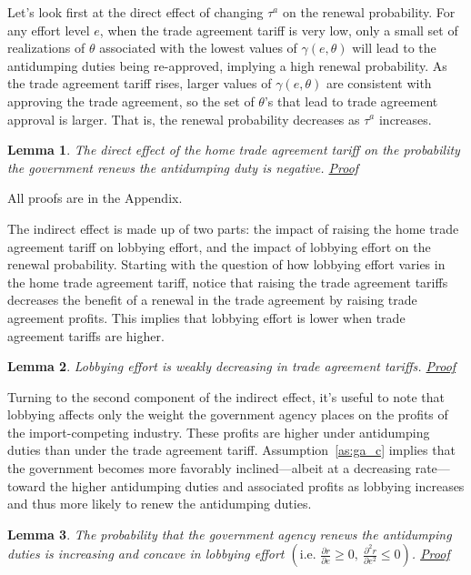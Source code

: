 \documentclass[10pt]{article}
\newtheorem{lemma}{Lemma}
\newcommand{\ta}{\theta}
\newcommand{\ga}{\gamma}
\begin{document}
Let's look first at the direct effect of changing $\tau^a$ on the renewal probability. For any effort level $e$, when the trade agreement tariff is very low, only a small set of realizations of $\ta$ associated with the lowest values of $\ga(e,\ta)$ will lead to the antidumping duties being re-approved, implying a high renewal probability. As the trade agreement tariff rises, larger values of $\ga(e,\ta)$ are consistent with approving the trade agreement, so the set of $\ta$'s that lead to trade agreement approval is larger. That is, the renewal probability decreases as $\tau^a$ increases. 

\begin{lemma}
  The direct effect of the home trade agreement tariff on the probability the government renews the antidumping duty is negative. \hyperlink{Pr_leg_a}{Proof}
  \label{res:leg_a}
\end{lemma}

All proofs are in the Appendix. 

The indirect effect is made up of two parts: the impact of raising the home trade agreement tariff on lobbying effort, and the impact of lobbying effort on the renewal probability. Starting with the question of how lobbying effort varies in the home trade agreement tariff, notice that raising the trade agreement tariffs decreases the benefit of a renewal in the trade agreement by raising trade agreement profits. This implies that lobbying effort is lower when trade agreement tariffs are higher.

\begin{lemma}
  Lobbying effort is weakly decreasing in trade agreement tariffs. \hyperlink{Pr_lobby}{Proof}
  \label{res:lobby}
\end{lemma}

Turning to the second component of the indirect effect, it's useful to note that lobbying affects only the weight the government agency places on the profits of the import-competing industry. These profits are higher under antidumping duties than under the trade agreement tariff. Assumption~\ref{as:ga_c} implies that the government becomes more favorably inclined---albeit at a decreasing rate---toward the higher antidumping duties and associated profits as lobbying increases and thus more likely to renew the antidumping duties. 

\begin{lemma}
  The probability that the government agency renews the antidumping duties is increasing and concave in lobbying effort $\left(\text{i.e. } \frac{\partial r}{\partial e} \geq 0, \ \frac{\partial^2 r}{\partial e^2} \leq 0  \right)$. \hyperlink{Pr_bincC}{Proof}
  \label{res:bincC}
\end{lemma}
\end{document}
